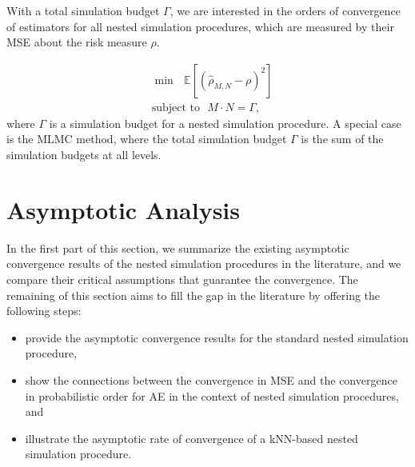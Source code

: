 With a total simulation budget $\Gamma$, we are interested in the orders of convergence of estimators for all nested simulation procedures, which are measured by their MSE about the risk measure $\rho$.

\begin{align}
    & \min ~~~ \mathbb{E} \left[ \left( \hat{\rho}_{M, N} - \rho \right)^2 \right] \nonumber \\
    & \text{subject to} ~~~ M \cdot N = \Gamma, 
\end{align}
where $\Gamma$ is a simulation budget for a nested simulation procedure.
A special case is the MLMC method, where the total simulation budget $\Gamma$ is the sum of the simulation budgets at all levels.

\section{Asymptotic Analysis} \label{sec1:asymptotic-convergence}
In the first part of this section, we summarize the existing asymptotic convergence results of the nested simulation procedures in the literature, and we compare their critical assumptions that guarantee the convergence.
The remaining of this section aims to fill the gap in the literature by offering the following steps:
\begin{itemize}
    \item provide the asymptotic convergence results for the standard nested simulation procedure, 
    \item show the connections between the convergence in MSE and the convergence in probabilistic order for AE in the context of nested simulation procedures, and
    \item illustrate the asymptotic rate of convergence of a kNN-based nested simulation procedure.
\end{itemize}

